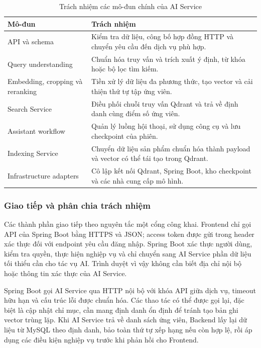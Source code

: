 \begin{table}[H]
    \centering
    \caption{Trách nhiệm các mô-đun chính của AI Service}
    \label{tab:ai-service-components}
    \begin{tabularx}{\textwidth}{|p{}|X|}
        \hline
        \textbf{Mô-đun} & \textbf{Trách nhiệm} \\
        \hline
        API và schema & Kiểm tra dữ liệu, công bố hợp đồng HTTP và chuyển yêu cầu đến dịch vụ phù hợp. \\
        \hline
        Query understanding & Chuẩn hóa truy vấn và trích xuất ý định, từ khóa hoặc bộ lọc tìm kiếm. \\
        \hline
        Embedding, cropping và reranking & Tiền xử lý dữ liệu đa phương thức, tạo vector và cải thiện thứ tự tập ứng viên. \\
        \hline
        Search Service & Điều phối chuỗi truy vấn Qdrant và trả về định danh cùng điểm số ứng viên. \\
        \hline
        Assistant workflow & Quản lý luồng hội thoại, sử dụng công cụ và lưu checkpoint của phiên. \\
        \hline
        Indexing Service & Chuyển dữ liệu sản phẩm chuẩn hóa thành payload và vector có thể tái tạo trong Qdrant. \\
        \hline
        Infrastructure adapters & Cô lập kết nối Qdrant, Spring Boot, kho checkpoint và các nhà cung cấp mô hình. \\
        \hline
    \end{tabularx}
\end{table}

\subsubsection{Giao tiếp và phân chia trách nhiệm}

Các thành phần giao tiếp theo nguyên tắc một cổng công khai. Frontend chỉ gọi API của Spring Boot bằng HTTPS và JSON; access token được gửi trong header xác thực đối với endpoint yêu cầu đăng nhập. Spring Boot xác thực người dùng, kiểm tra quyền, thực hiện nghiệp vụ và chỉ chuyển sang AI Service phần dữ liệu tối thiểu cần cho tác vụ AI. Trình duyệt vì vậy không cần biết địa chỉ nội bộ hoặc thông tin xác thực của AI Service.

Spring Boot gọi AI Service qua HTTP nội bộ với khóa API giữa dịch vụ, timeout hữu hạn và cấu trúc lỗi được chuẩn hóa. Các thao tác có thể được gọi lại, đặc biệt là cập nhật chỉ mục, cần mang định danh ổn định để tránh tạo bản ghi vector trùng lặp. Khi AI Service trả về danh sách ứng viên, Backend lấy lại dữ liệu từ MySQL theo định danh, bảo toàn thứ tự xếp hạng nếu còn hợp lệ, rồi áp dụng các điều kiện nghiệp vụ trước khi phản hồi cho Frontend.

